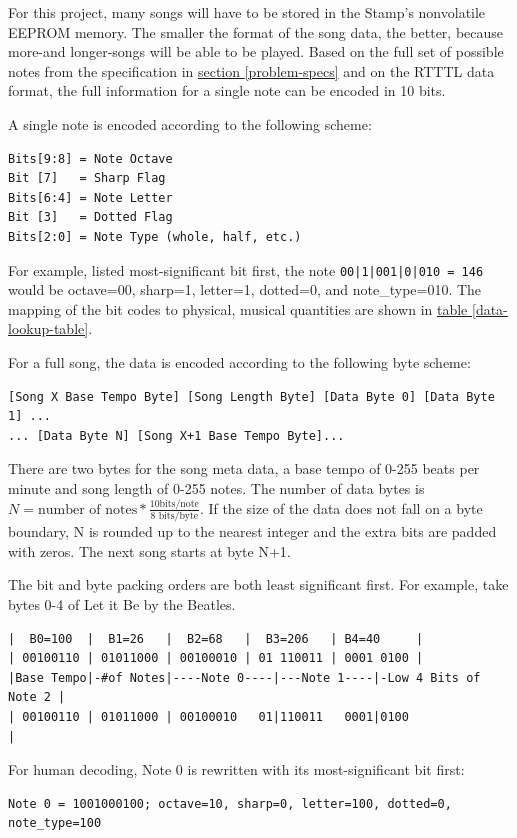 \documentclass[11pt]{article}
\begin{document}
For this project, many songs will have to be stored in the Stamp's nonvolatile
EEPROM memory. The smaller the format of the song data, the better, because
more-and longer-songs will be able to be played.
Based on the full set of possible notes from the specification in
\hyperref[problem-specs]{section \ref{problem-specs}} and on the RTTTL data format,
the full information for a single note can be encoded in 10 bits.

A single note is encoded according to the following scheme:
\begin{verbatim}
Bits[9:8] = Note Octave
Bit [7]   = Sharp Flag
Bits[6:4] = Note Letter
Bit [3]   = Dotted Flag
Bits[2:0] = Note Type (whole, half, etc.)
\end{verbatim}
For example, listed most-significant bit first, the note \texttt{00|1|001|0|010 = 146}
would be octave=00, sharp=1, letter=1, dotted=0, and note\_type=010.
The mapping of the bit codes to physical, musical quantities are shown in
\hyperref[data-lookup-table]{table \ref{data-lookup-table}}.

For a full song, the data is encoded according to the following byte scheme:
\begin{verbatim}
[Song X Base Tempo Byte] [Song Length Byte] [Data Byte 0] [Data Byte 1] ...
... [Data Byte N] [Song X+1 Base Tempo Byte]...
\end{verbatim}
There are two bytes for the song meta data, a base tempo of 0-255 beats per minute and song length of 0-255 notes.
The number of data bytes is $N=\textrm{number of notes}*\frac{\textrm{10bits/note}}{\textrm{8 bits/byte}}$.
If the size of the data does not fall on a byte boundary, N is rounded up to the nearest integer and the
extra bits are padded with zeros. The next song starts at byte N+1.

The bit and byte packing orders are both least significant first.
For example, take bytes 0-4 of Let it Be by the Beatles.
\begin{verbatim}
|  B0=100  |  B1=26   |  B2=68   |  B3=206   | B4=40     |
| 00100110 | 01011000 | 00100010 | 01 110011 | 0001 0100 |
|Base Tempo|-#of Notes|----Note 0----|---Note 1----|-Low 4 Bits of Note 2 |
| 00100110 | 01011000 | 00100010   01|110011   0001|0100                  |
\end{verbatim}
For human decoding, Note 0 is rewritten with its most-significant bit first:
\begin{verbatim}
Note 0 = 1001000100; octave=10, sharp=0, letter=100, dotted=0, note_type=100
\end{verbatim}
\end{document}
